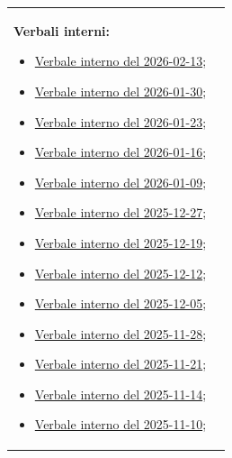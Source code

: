 \documentclass[a4paper,12pt]{article}
\begin{document}
\begin{tabular}{p{} p{}}

\textbf{Verbali interni:}
\begin{itemize}[leftmargin=*]
    \item \href{https://7-zpus.github.io/Docs/assets/2_RTB/DocumentiInterni/Verbali/2026-02-13-VerbaleInterno.pdf}{Verbale interno del 2026-02-13};
    \item \href{https://7-zpus.github.io/Docs/assets/2_RTB/DocumentiInterni/Verbali/2026-01-30-VerbaleInterno.pdf}{Verbale interno del 2026-01-30};
    \item \href{https://7-zpus.github.io/Docs/assets/2_RTB/DocumentiInterni/Verbali/2026-01-23-VerbaleInterno.pdf}{Verbale interno del 2026-01-23};
    \item \href{https://7-zpus.github.io/Docs/assets/2_RTB/DocumentiInterni/Verbali/2026-01-16-VerbaleInterno.pdf}{Verbale interno del 2026-01-16};
    \item \href{https://7-zpus.github.io/Docs/assets/2_RTB/DocumentiInterni/Verbali/2026-01-09-VerbaleInterno.pdf}{Verbale interno del 2026-01-09};
    \item \href{https://7-zpus.github.io/Docs/assets/2_RTB/DocumentiInterni/Verbali/2025-12-27-VerbaleInterno.pdf}{Verbale interno del 2025-12-27};
    \item \href{https://7-zpus.github.io/Docs/assets/2_RTB/DocumentiInterni/Verbali/2025-12-19-VerbaleInterno.pdf}{Verbale interno del 2025-12-19};
    \item \href{https://7-zpus.github.io/Docs/assets/2_RTB/DocumentiInterni/Verbali/2025-12-12-VerbaleInterno.pdf}{Verbale interno del 2025-12-12};
    \item \href{https://7-zpus.github.io/Docs/assets/2_RTB/DocumentiInterni/Verbali/2025-12-05-VerbaleInterno.pdf}{Verbale interno del 2025-12-05};
    \item \href{https://7-zpus.github.io/Docs/assets/2_RTB/DocumentiInterni/Verbali/2025-11-28-VerbaleInterno.pdf}{Verbale interno del 2025-11-28};
    \item \href{https://7-zpus.github.io/Docs/assets/2_RTB/DocumentiInterni/Verbali/2025-11-21-VerbaleInterno.pdf}{Verbale interno del 2025-11-21};
    \item \href{https://7-zpus.github.io/Docs/assets/2_RTB/DocumentiInterni/Verbali/2025-11-14-VerbaleInterno.pdf}{Verbale interno del 2025-11-14};
    \item \href{https://7-zpus.github.io/Docs/assets/2_RTB/DocumentiInterni/Verbali/2025-11-10-VerbaleInterno.pdf}{Verbale interno del 2025-11-10};

\end{itemize}
\end{tabular}
\end{document}
